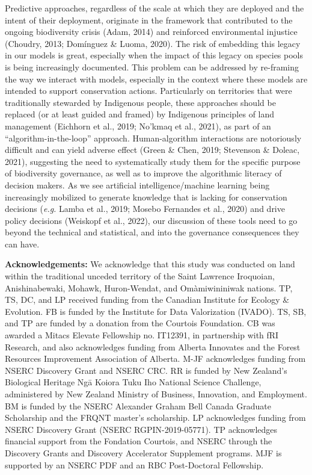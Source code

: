 \documentclass[11pt]{article}
\begin{document}
Predictive approaches, regardless of the scale at which they are
deployed and the intent of their deployment, originate in the framework
that contributed to the ongoing biodiversity crisis (Adam, 2014) and
reinforced environmental injustice (Choudry, 2013; Domínguez \& Luoma,
2020). The risk of embedding this legacy in our models is great,
especially when the impact of this legacy on species pools is being
increasingly documented. This problem can be addressed by re-framing the
way we interact with models, especially in the context where these
models are intended to support conservation actions. Particularly on
territories that were traditionally stewarded by Indigenous people,
these approaches should be replaced (or at least guided and framed) by
Indigenous principles of land management (Eichhorn et al., 2019; No'kmaq
et al., 2021), as part of an ``algorithm-in-the-loop'' approach.
Human-algorithm interactions are notoriously difficult and can yield
adverse effect (Green \& Chen, 2019; Stevenson \& Doleac, 2021),
suggesting the need to systematically study them for the specific
purpose of biodiversity governance, as well as to improve the
algorithmic literacy of decision makers. As we see artificial
intelligence/machine learning being increasingly mobilized to generate
knowledge that is lacking for conservation decisions (\emph{e.g.} Lamba
et al., 2019; Mosebo Fernandes et al., 2020) and drive policy decisions
(Weiskopf et al., 2022), our discussion of these tools need to go beyond
the technical and statistical, and into the governance consequences they
can have.

\textbf{Acknowledgements:} We acknowledge that this study was conducted
on land within the traditional unceded territory of the Saint Lawrence
Iroquoian, Anishinabewaki, Mohawk, Huron-Wendat, and Omàmiwininiwak
nations. TP, TS, DC, and LP received funding from the Canadian Institute
for Ecology \& Evolution. FB is funded by the Institute for Data
Valorization (IVADO). TS, SB, and TP are funded by a donation from the
Courtois Foundation. CB was awarded a Mitacs Elevate Fellowship no.
IT12391, in partnership with fRI Research, and also acknowledges funding
from Alberta Innovates and the Forest Resources Improvement Association
of Alberta. M-JF acknowledges funding from NSERC Discovery Grant and
NSERC CRC. RR is funded by New Zealand's Biological Heritage Ngā Koiora
Tuku Iho National Science Challenge, administered by New Zealand
Ministry of Business, Innovation, and Employment. BM is funded by the
NSERC Alexander Graham Bell Canada Graduate Scholarship and the FRQNT
master's scholarship. LP acknowledges funding from NSERC Discovery Grant
(NSERC RGPIN-2019-05771). TP acknowledges financial support from the
Fondation Courtois, and NSERC through the Discovery Grants and Discovery
Accelerator Supplement programs. MJF is supported by an NSERC PDF and an
RBC Post-Doctoral Fellowship.
\end{document}
